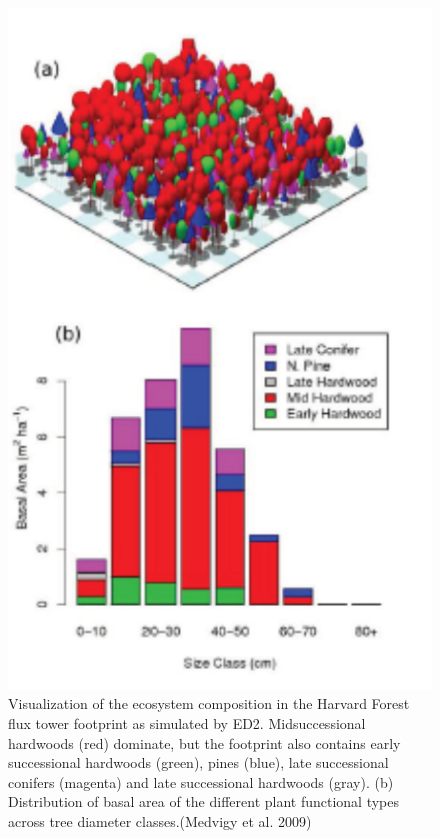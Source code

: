 \documentclass[
  12pt,
  oneside]{book}
\begin{document}
\begin{figure}

{\centering \includegraphics[width=0.8\linewidth]{figures/chap6/f618_ED_harvard} 

}

\caption{ Visualization of the ecosystem composition in the Harvard Forest flux tower footprint as simulated by ED2. Midsuccessional hardwoods (red) dominate, but the footprint also contains early successional hardwoods (green), pines (blue), late successional conifers (magenta) and late successional hardwoods (gray). (b) Distribution of basal area of the different plant functional types across tree diameter classes.(Medvigy et al. 2009)}\label{fig:f618}
\end{figure}
\end{document}
